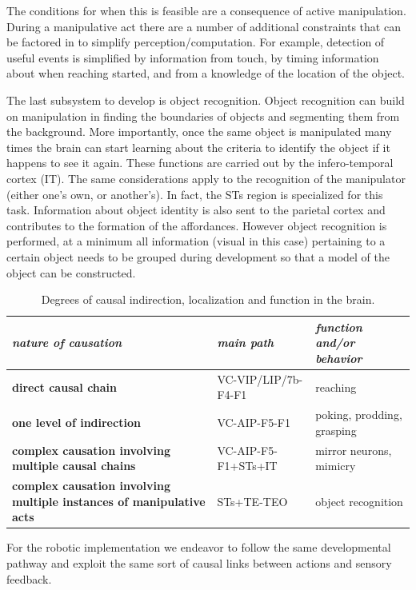 The conditions for when this is feasible are a consequence of active
manipulation. During a manipulative act there are a number of
additional constraints that can be factored in to simplify
perception/computation.  For example, detection of useful events is
simplified by information from touch, by timing information 
about when
reaching started, and from a knowledge of the location of the object.%

The last subsystem to develop is object recognition. Object 
recognition can build on manipulation in finding the boundaries
of objects and segmenting them from the background. More importantly,
once the same object is manipulated many times the brain can
start learning about the criteria to identify the object if 
it happens to see it again. These functions are
carried out by the infero-temporal cortex (IT).
The same considerations apply to the recognition of the 
manipulator (either one's own, or another's). In fact, the STs region is specialized
for this task. Information about object identity is
also sent to the parietal cortex and contributes to 
the formation of the affordances. 
However object recognition is performed, at a minimum all information (visual in this case) pertaining to a certain object
needs to be grouped during development so that a model of the object can be constructed.

\begin{table}[htbp]
\begin{center}
\begin{tabular}{|p{3.5cm}|p{2.5cm}|p{4.5cm}|}
\hline
{\it nature of causation} & {\it main path} &  {\it function and/or behavior} \\ \hline\hline
{\bf direct causal chain} & VC-VIP/LIP/7b-F4-F1 & reaching\\ \hline
{\bf one level of indirection} & VC-AIP-F5-F1 & poking, prodding, grasping\\ \hline
{\bf complex causation involving multiple causal chains} & VC-AIP-F5-F1+STs+IT & mirror neurons, mimicry\\ \hline
{\bf complex causation involving multiple instances of manipulative acts} & STs+TE-TEO & object recognition\\ \hline
\end{tabular}
\caption{
\label{tab:circuits}
%
Degrees of causal indirection, localization and function in the brain.
%
}
\end{center}
\end{table}

For the robotic implementation we endeavor to follow the same developmental
pathway and exploit the same sort of causal links between actions and 
sensory feedback.


